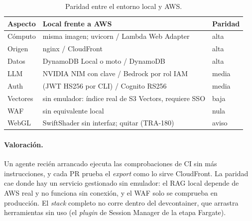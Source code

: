 \begin{table}[tb]
\centering\footnotesize
\caption{Paridad entre el entorno local y AWS.}
\label{tab:07-paridad}
\begin{tabularx}{\columnwidth}{@{}lYl@{}}
\toprule
Aspecto & Local frente a AWS & Paridad \\
\midrule
Cómputo & misma imagen; uvicorn / Lambda Web Adapter & alta \\
Origen & nginx  / CloudFront & alta \\
Datos & DynamoDB Local o moto / DynamoDB & alta \\
LLM & NVIDIA NIM con clave / Bedrock por rol IAM & media \\
Auth &  (JWT HS256 por CLI) / Cognito RS256 & media \\
Vectores & sin emulador: índice real de S3 Vectors, requiere SSO & baja \\
WAF & sin equivalente local & nula \\
WebGL & SwiftShader sin interfaz; quitar  (TRA-180) & aviso \\
\bottomrule
\end{tabularx}
\end{table}

\paragraph{Valoración.} Un agente recién arrancado ejecuta las comprobaciones de CI sin más
instrucciones, y cada PR prueba el \emph{export} como lo sirve CloudFront. La paridad cae donde
hay un servicio gestionado sin emulador: el RAG local depende de AWS real y no funciona sin conexión, y el WAF solo se comprueba
en producción. El \emph{stack} completo no corre dentro del devcontainer, que arrastra herramientas sin
uso (el \emph{plugin} de Session Manager de la etapa Fargate).
